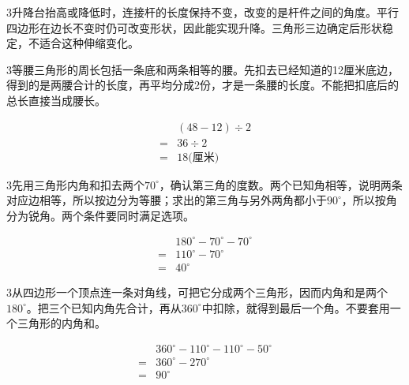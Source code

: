 \documentclass[multi=snippet,border={5bp 20bp 5bp 5bp}]{standalone}
\newenvironment{snippet}[3]{\begin{minipage}{#1bp}\color{answerred}\fontsize{#2}{#3}\selectfont\raggedright}{\end{minipage}}
\begin{document}
\begin{snippet}{505}{11.5}{14}\begin{multicols}{3}\raggedcolumns 升降台抬高或降低时，连接杆的长度保持不变，改变的是杆件之间的角度。平行四边形在边长不变时仍可改变形状，因此能实现升降。三角形三边确定后形状稳定，不适合这种伸缩变化。\end{multicols}\end{snippet}
\begin{snippet}{505}{11.5}{14}\begin{multicols}{3}\raggedcolumns 等腰三角形的周长包括一条底和两条相等的腰。先扣去已经知道的12厘米底边，得到的是两腰合计的长度，再平均分成2份，才是一条腰的长度。不能把扣底后的总长直接当成腰长。\par \[\begin{aligned}&(48-12)\div2\\={}&36\div2\\={}&18\text{(厘米)}\end{aligned}\]\end{multicols}\end{snippet}
\begin{snippet}{505}{11.5}{14}\begin{multicols}{3}\raggedcolumns 先用三角形内角和扣去两个\(70^\circ\)\allowbreak ，确认第三角的度数。两个已知角相等，说明两条对应边相等，所以按边分为等腰；求出的第三角与另外两角都小于\(90^\circ\)\allowbreak ，所以按角分为锐角。两个条件要同时满足选项。\par \[\begin{aligned}&180^\circ-70^\circ-70^\circ\\={}&110^\circ-70^\circ\\={}&40^\circ\end{aligned}\]\end{multicols}\end{snippet}
\begin{snippet}{505}{11.5}{14}\begin{multicols}{3}\raggedcolumns 从四边形一个顶点连一条对角线，可把它分成两个三角形，因而内角和是两个\(180^\circ\)\allowbreak 。把三个已知内角先合计，再从\(360^\circ\)\allowbreak 中扣除，就得到最后一个角。不要套用一个三角形的内角和。\par \[\begin{aligned}&360^\circ-110^\circ-110^\circ-50^\circ\\={}&360^\circ-270^\circ\\={}&90^\circ\end{aligned}\]\end{multicols}\end{snippet}
\end{document}
